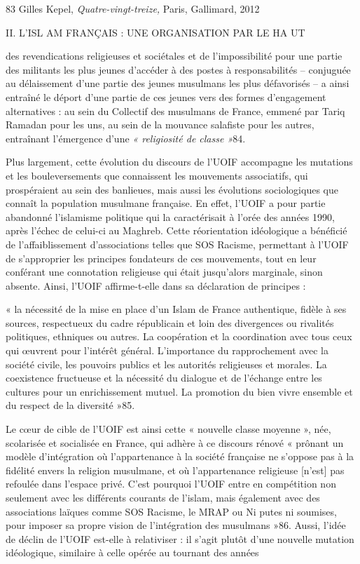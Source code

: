 83 Gilles Kepel, \emph{Quatre-vingt-treize,} Paris, Gallimard, 2012

II. L'ISL AM FRANÇAIS : UNE ORGANISATION PAR LE HA UT

des revendications religieuses et sociétales et de l'impossibilité pour
une partie des militants les plus jeunes d'accéder à des postes à
responsabilités -- conjuguée au délaissement d'une partie des jeunes
musulmans les plus défavorisés -- a ainsi entraîné le déport d'une
partie de ces jeunes vers des formes d'engagement alternatives : au sein
du Collectif des musulmans de France, emmené par Tariq Ramadan pour les
uns, au sein de la mouvance salafiste pour les autres, entraînant
l'émergence d'une \emph{« religiosité de classe »}84.

Plus largement, cette évolution du discours de l'UOIF accompagne les
mutations et les bouleversements que connaissent les mouvements
associatifs, qui prospéraient au sein des banlieues, mais aussi les
évolutions sociologiques que connaît la population musulmane française.
En effet, l'UOIF a pour partie abandonné l'islamisme politique qui la
caractérisait à l'orée des années 1990, après l'échec de celui-ci au
Maghreb. Cette réorientation idéologique a bénéficié de
l'affaiblissement d'associations telles que SOS Racisme, permettant à
l'UOIF de s'approprier les principes fondateurs de ces mouvements, tout
en leur conférant une connotation religieuse qui était jusqu'alors
marginale, sinon absente. Ainsi, l'UOIF affirme-t-elle dans sa
déclaration de principes :

« la nécessité de la mise en place d'un Islam de France authentique,
fidèle à ses sources, respectueux du cadre républicain et loin des
divergences ou rivalités politiques, ethniques ou autres. La coopération
et la coordination avec tous ceux qui œuvrent pour l'intérêt général.
L'importance du rapprochement avec la société civile, les pouvoirs
publics et les autorités religieuses et morales. La coexistence
fructueuse et la nécessité du dialogue et de l'échange entre les
cultures pour un enrichissement mutuel. La promotion du bien vivre
ensemble et du respect de la diversité »85.

Le cœur de cible de l'UOIF est ainsi cette « nouvelle classe moyenne »,
née, scolarisée et socialisée en France, qui adhère à ce discours rénové
« prônant un modèle d'intégration où l'appartenance à la société
française ne s'oppose pas à la fidélité envers la religion musulmane, et
où l'appartenance religieuse {[}n'est{]} pas refoulée dans l'espace
privé. C'est pourquoi l'UOIF entre en compétition non seulement avec les
différents courants de l'islam, mais également avec des associations
laïques comme SOS Racisme, le MRAP ou Ni putes ni soumises, pour imposer
sa propre vision de l'intégration des musulmans »86. Aussi, l'idée de
déclin de l'UOIF est-elle à relativiser : il s'agit plutôt d'une
nouvelle mutation idéologique, similaire à celle opérée au tournant des
années

